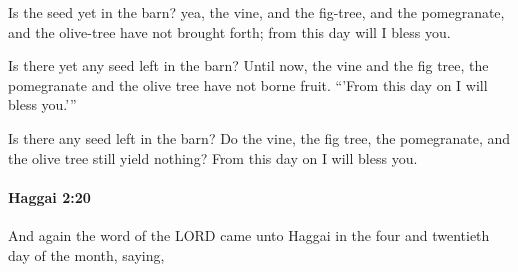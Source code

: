 			\begin{versebox}
					\item[BHS] 
					\item[LXX] 
					\item[ASV] Is the seed yet in the barn? yea, the vine, and the fig-tree, and the pomegranate, and the olive-tree have not brought forth; from this day will I bless you.
					\item[NIV] Is there yet any seed left in the barn? Until now, the vine and the fig tree, the pomegranate and the olive tree have not borne fruit. “’From this day on I will bless you.’”
					\item[NRSV] Is there any seed left in the barn? Do the vine, the fig tree, the pomegranate, and the olive tree still yield nothing? From this day on I will bless you.
			\end{versebox}

		\paragraph{Haggai 2:20} %
			\label{HAGGAI-2-20}

			And again the word of the LORD came unto Haggai in the four and twentieth day of the month, saying,

